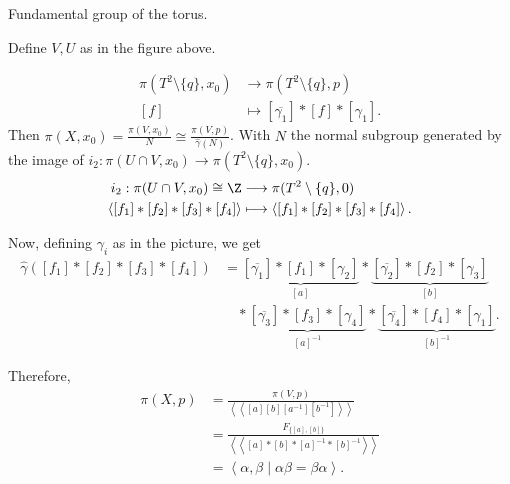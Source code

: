 \begin{eg}
    Fundamental group of the torus.

    \begin{figure}[H]
        \centering
        \label{fig:fundamental-group-of-the-torus-using-van-kampen}
    \end{figure}
    Define $V, U$ as in the figure above.

    \begin{align*}
        \pi(T^2 \setminus \{q\}, x_0) &\longrightarrow  \pi(T^2 \setminus \{q\} , p) \\
        [f] &\longmapsto [ \overline{\gamma_1}] * [f] * [\gamma_1]
    .\end{align*}
    Then $\pi(X, x_0) = \frac{\pi(V, x_0)}{N} \cong \frac{\pi(V, p)}{\hat{\gamma}(N)}$.
    With $N$ the normal subgroup generated by the image of  $i_2: \pi(U \cap V, x_0) \to  \pi(T^2 \setminus \{ q\} , x_0)$.
\begin{align*}
    i_2  :  \pi(U \cap V, x_0) \cong \Z &\longrightarrow  \pi(T^2 \setminus \{ q\} , 0)\\
    \left<[f_1] * [f_2] * [f_3] * [f_4] \right>&\longmapsto \left<[f_1] * [f_2] * [f_3] * [f_4] \right>
.\end{align*}

\begin{figure}[H]
    \centering
    \label{fig:fundamental-group-of-the-torus-using-van-kampen-2}
\end{figure}

Now, defining  $\gamma_i$ as in the picture, we get
\begin{align*}
    \hat{\gamma}([f_1] *[f_2] * [f_3] * [f_4]) &= 
    \underbrace{[\overline{\gamma_1}]
    * [f_1] * [\gamma_2]}_{[a]} *
    \underbrace{[\overline{\gamma_2}] * [f_2] * [\gamma_3]}_{[b]}\\
                                               & \quad * \underbrace{[\overline{\gamma_3}] * [f_3] * [\gamma_4]}_{[a]^{-1}} *
    \underbrace{[\overline{\gamma_4}] * [f_4] * [\gamma_1]}_{[b]^{-1}}
.\end{align*} 

Therefore,
\begin{align*}
    \pi(X, p) &= \frac{\pi(V, p)}{\left<\left<[a][b][a^{-1}][b^{-1}] \right> \right>}\\ &= \frac{F_{\{[a], [b]\} }}{\left<\left<[a] * [b] * [a]^{-1} * [b] ^{-1} \right> \right>} \\&= \left<\alpha, \beta  \mid  \alpha\beta = \beta\alpha \right>
.\end{align*} 
\end{eg}
